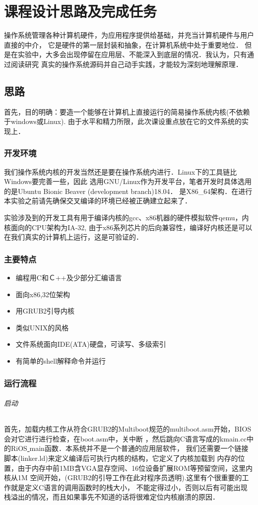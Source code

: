 \chapter{课程设计思路及完成任务} 
操作系统管理各种计算机硬件，为应用程序提供给基础，并充当计算机硬件与用户直接的中介，
它是硬件的第一层封装和抽象，在计算机系统中处于重要地位．
但是在实验中，大多会出现停留在应用层、不能深入到底层的情况．我认为，只有通过阅读研究
真实的操作系统源码并自己动手实践，才能较为深刻地理解原理．

\section{思路}
首先，目的明确：要造一个能够在计算机上直接运行的简易操作系统内核(不依赖于windows或Linux).
由于水平和精力所限，此次课设重点放在它的文件系统的实现上．
\subsection{开发环境}
我们操作系统内核的开发当然还是要在操作系统内进行．Linux下的工具链比Windows要完善一些，因此
选用GNU/Linux作为开发平台，笔者开发时具体选用的是Ubuntu Bionic Beaver (development branch)18.04．
是X86\_64架构．在进行本实验之前请先确保交叉编译的环境已经被正确建立起来了．

实验涉及到的开发工具有用于编译内核的gcc、x86机器的硬件模拟软件qemu，内核面向的CPU架构为IA-32,
由于x86系列芯片的后向兼容性，编译好内核还是可以在我们真实的计算机上运行，这是可验证的．
\subsection{主要特点}
\begin{itemize}
\item 编程用C和Ｃ++及少部分汇编语言
\item 面向x86,32位架构
\item 用GRUB2引导内核
\item 类似UNIX的风格
\item 文件系统面向IDE(ATA)硬盘，可读写、多级索引
\item 有简单的shell解释命令并运行
\end{itemize}
\subsection{运行流程}
\subparagraph{启动}
首先，加载内核工作从符合GRUB2的Multiboot规范的multiboot.asm开始，BIOS会对它进行进行检查，在boot.asm中，关中断
，然后跳向C语言写成的kmain.cc中的RiOS\underline{ }main函数．本系统并不是一个普通的应用层软件，
我们还需要一个链接脚本(linker.ld)来定义编译后可执行内核的结构，它定义了内核加载到
内存的位置，由于内存中前1MB含VGA显存空间、16位设备扩展ROM等预留空间，这里内核从1M
空间开始，(GRUB2的引导工作在此对程序员透明).这里有个很重要的工作就是定义C语言的调用函数时的栈大小，
不能定得过小，否则以后有可能出现栈溢出的情况，而且如果事先不知道的话将很难定位内核崩溃的原因．

